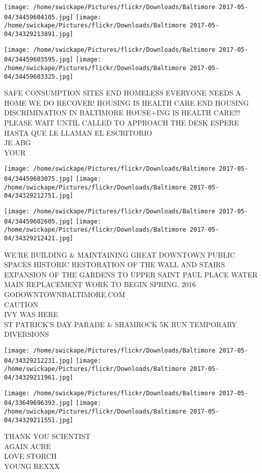 \documentclass[10pt,letterpaper]{article}
\begin{document}
\texttt{[image: /home/swickape/Pictures/flickr/Downloads/Baltimore 2017-05-04/34459604105.jpg]}
\texttt{[image: /home/swickape/Pictures/flickr/Downloads/Baltimore 2017-05-04/34329213891.jpg]}

\texttt{[image: /home/swickape/Pictures/flickr/Downloads/Baltimore 2017-05-04/34459603595.jpg]}
\texttt{[image: /home/swickape/Pictures/flickr/Downloads/Baltimore 2017-05-04/34459603325.jpg]}

SAFE CONSUMPTION SITES END HOMELESS EVERYONE NEEDS A HOME WE DO RECOVER!  HOUSING IS HEALTH CARE END HOUSING DISCRIMINATION IN BALTIMORE HOUSE+ING IS HEALTH CARE!!!\\
PLEASE WAIT UNTIL CALLED TO APPROACH THE DESK ESPERE HASTA QUE LE LLAMAN EL ESCRITORIO\\
JE ABG\\
YOUR
\pagebreak

\texttt{[image: /home/swickape/Pictures/flickr/Downloads/Baltimore 2017-05-04/34459603075.jpg]}
\texttt{[image: /home/swickape/Pictures/flickr/Downloads/Baltimore 2017-05-04/34329212751.jpg]}

\texttt{[image: /home/swickape/Pictures/flickr/Downloads/Baltimore 2017-05-04/34459602605.jpg]}
\texttt{[image: /home/swickape/Pictures/flickr/Downloads/Baltimore 2017-05-04/34329212421.jpg]}

WE'RE BUILDING \& MAINTAINING GREAT DOWNTOWN PUBLIC SPACES HISTORIC RESTORATION OF THE WALL AND STAIRS EXPANSION OF THE GARDENS TO UPPER SAINT PAUL PLACE WATER MAIN REPLACEMENT WORK TO BEGIN SPRING, 2016 GODOWNTOWNBALTIMORE.COM\\
CAUTION\\
IVY WAS HERE\\
ST PATRICK'S DAY PARADE \& SHAMROCK 5K RUN TEMPORARY DIVERSIONS
\pagebreak

\texttt{[image: /home/swickape/Pictures/flickr/Downloads/Baltimore 2017-05-04/34329212231.jpg]}
\texttt{[image: /home/swickape/Pictures/flickr/Downloads/Baltimore 2017-05-04/34329211961.jpg]}

\texttt{[image: /home/swickape/Pictures/flickr/Downloads/Baltimore 2017-05-04/33649696393.jpg]}
\texttt{[image: /home/swickape/Pictures/flickr/Downloads/Baltimore 2017-05-04/34329211551.jpg]}

THANK YOU SCIENTIST\\
AGAIN ACRE\\
LOVE STORCH\\
YOUNG REXXX
\pagebreak
\end{document}
